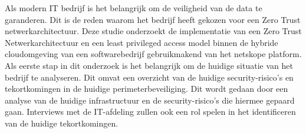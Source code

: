 




Als modern IT bedrijf is het belangrijk om de veiligheid van de data te garanderen. 
Dit is de reden waarom het bedrijf heeft gekozen voor een Zero Trust netwerkarchitectuur. 
Deze studie onderzoekt de implementatie van een Zero Trust Netwerkarchitectuur en een least privileged access model binnen de hybride cloudomgeving van een softwarebedrijf gebruikmakend van het netskope platform.
Als eerste stap in dit onderzoek is het belangrijk om de huidige situatie van het bedrijf te analyseren. 
Dit omvat een overzicht van de huidige security-risico’s en tekortkomingen in de huidige perimeterbeveiliging.
Dit wordt gedaan door een analyse van de huidige infrastructuur en de security-risico’s die hiermee gepaard gaan. Interviews met de IT-afdeling zullen ook een rol spelen in het identificeren van de huidige tekortkomingen.

